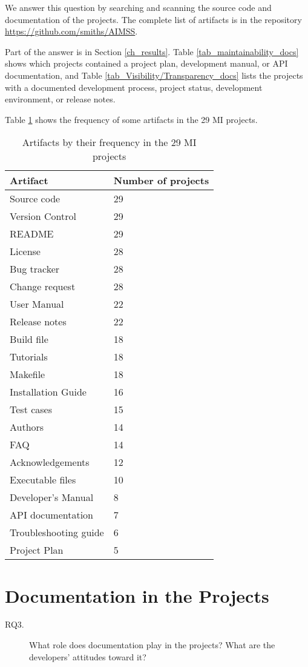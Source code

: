 We answer this question by searching and scanning the source code and documentation of the projects. The complete list of artifacts is in the repository \hyperlink{https://github.com/smiths/AIMSS}{https://github.com/smiths/AIMSS}.

Part of the answer is in Section \ref{ch_results}. Table \ref{tab_maintainability_docs} shows which projects contained a project plan, development manual, or API documentation, and Table \ref{tab_Visibility/Transparency_docs} lists the projects with a documented development process, project status, development environment, or release notes.

Table \ref{tab_artifacts_frequency} shows the frequency of some artifacts in the 29 MI projects.

\begin{table}[H]
\centering
\begin{tabular}{ll}
\hline
Artifact & Number of projects \\ \hline
Source code & 29 \\
Version Control & 29 \\
README & 29 \\
License & 28 \\
Bug tracker & 28 \\
Change request & 28 \\
User Manual & 22 \\
Release notes & 22 \\
Build file & 18 \\
Tutorials & 18 \\
Makefile & 18 \\
Installation Guide & 16 \\
Test cases & 15 \\
Authors & 14 \\
FAQ & 14 \\
Acknowledgements & 12 \\
Executable files & 10 \\
Developer's Manual & 8 \\
API documentation & 7 \\
Troubleshooting guide & 6 \\
Project Plan & 5 \\ \hline
\end{tabular}
\caption{\label{tab_artifacts_frequency}Artifacts by their frequency in the 29 MI projects}
\end{table}

\section{Documentation in the Projects}
\label{sec_rq3_documentation}
\begin{description}\item[RQ3.] What role does documentation play in the projects? What are the developers' attitudes toward it?\end{description}

